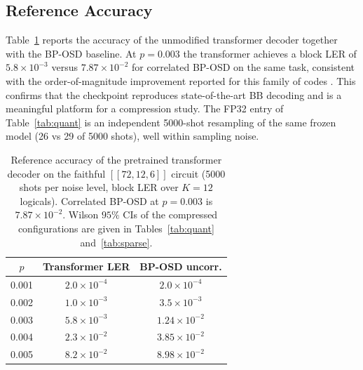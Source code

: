 ﻿\documentclass[conference]{IEEEtran}
\begin{document}
\subsection{Reference Accuracy}
Table~\ref{tab:ref} reports the accuracy of the unmodified transformer
decoder together with the BP-OSD baseline. At $p{=}0.003$ the transformer
achieves a block LER of $5.8\times10^{-3}$ versus $7.87\times10^{-2}$ for
correlated BP-OSD on the same task, consistent with the order-of-magnitude
improvement reported for this family of codes \cite{blue2026}. This
confirms that the checkpoint reproduces state-of-the-art BB decoding and is
a meaningful platform for a compression study. The FP32 entry of
Table~\ref{tab:quant} is an independent 5000-shot resampling of the same
frozen model (26 vs 29 of 5000 shots), well within sampling noise.
\begin{table}[t]
\caption{Reference accuracy of the pretrained transformer decoder on the
faithful $[[72,12,6]]$ circuit (5000 shots per noise level, block LER over
$K{=}12$ logicals). Correlated BP-OSD at
$p{=}0.003$ is $7.87\times10^{-2}$. Wilson $95\%$ CIs of the compressed
configurations are given in Tables~\ref{tab:quant} and~\ref{tab:sparse}.}
\label{tab:ref}
\centering
\begin{tabular}{ccc}
\toprule
$p$ & Transformer LER & BP-OSD uncorr. \\
\midrule
0.001 & $2.0\times10^{-4}$ & $2.0\times10^{-4}$ \\
0.002 & $1.0\times10^{-3}$ & $3.5\times10^{-3}$ \\
0.003 & $5.8\times10^{-3}$ & $1.24\times10^{-2}$ \\
0.004 & $2.3\times10^{-2}$ & $3.85\times10^{-2}$ \\
0.005 & $8.2\times10^{-2}$ & $8.98\times10^{-2}$ \\
\bottomrule
\end{tabular}
\end{table}
\end{document}
